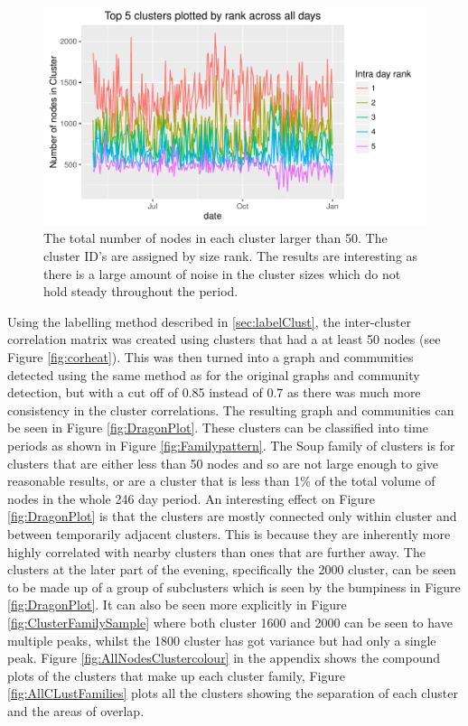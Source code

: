 \begin{figure}[ht]
    \centering
    \includegraphics[width=\textwidth]{Figures/Results/Clusterrank}
    \caption[Size comparison of the largest clusters]{The total number of nodes in each cluster larger than 50. The cluster ID's are assigned by size rank. The results are interesting as there is a large amount of noise in the cluster sizes which do not hold steady throughout the period.}
    \label{fig:clustrank}
\end{figure}
\FloatBarrier 

Using the labelling method described in \ref{sec:labelClust}, the inter-cluster correlation matrix was created using clusters that had a at least 50 nodes (see Figure \ref{fig:corheat}). This was then turned into a graph and communities detected using the same method as for the original graphs and community detection, but with a cut off of 0.85 instead of 0.7 as there was much more consistency in the cluster correlations. The resulting graph and communities can be seen in Figure \ref{fig:DragonPlot}. These clusters can be classified into time periods as shown in Figure \ref{fig:Familypattern}. The Soup family of clusters is for clusters that are either less than 50 nodes and so are not large enough to give reasonable results, or are a cluster that is less than 1\% of the total volume of nodes in the whole 246 day period. An interesting effect on Figure \ref{fig:DragonPlot} is that the clusters are mostly connected only within cluster and between temporarily adjacent clusters. This is because they are inherently more highly correlated with nearby clusters than ones that are further away. The clusters at the later part of the evening, specifically the 2000 cluster, can be seen to be made up of a group of subclusters which is seen by the bumpiness in Figure \ref{fig:DragonPlot}. It can also be seen more explicitly in Figure \ref{fig:ClusterFamilySample} where both cluster 1600 and 2000 can be seen to have multiple peaks, whilst the 1800 cluster has got variance but had only a single peak. Figure \ref{fig:AllNodesClustercolour} in the appendix shows the compound plots of the clusters that make up each cluster family, Figure \ref{fig:AllCLustFamilies} plots all the clusters showing the separation of each cluster and the areas of overlap.


